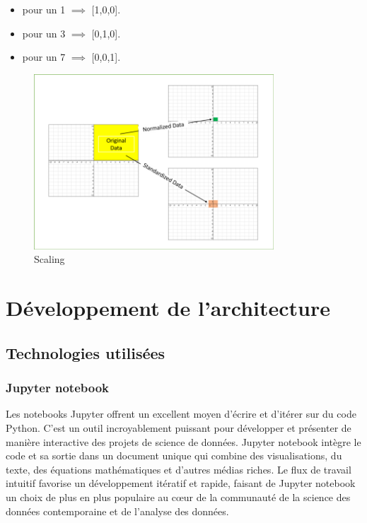 \documentclass[oneside,13pt,a4paper]{report}
\begin{document}
\begin{itemize}
	\item pour un 1 $\implies$ [1,0,0].
	\item pour un 3 $\implies$ [0,1,0].
	\item pour un 7 $\implies$ [0,0,1].
\end{itemize}

\begin{figure}[h!]
	\begin{center}
		\includegraphics[width=0.8\textwidth]{img/normalisation.png}
	\end{center}
	\caption{Scaling}
\end{figure}



\chapter{Développement de l’architecture}

\section{Technologies utilisées}

\subsection{Jupyter notebook}

Les notebooks Jupyter offrent un excellent moyen d'écrire et d'itérer sur du code Python. C'est un outil incroyablement puissant pour développer et présenter de manière interactive des projets de science de données. Jupyter notebook intègre le code et sa sortie dans un document unique qui combine des visualisations, du texte, des équations mathématiques et d'autres médias riches. Le flux de travail intuitif favorise un développement itératif et rapide, faisant de Jupyter notebook un choix de plus en plus populaire au cœur de la communauté de la science des données contemporaine et de l'analyse des données.
\end{document}
